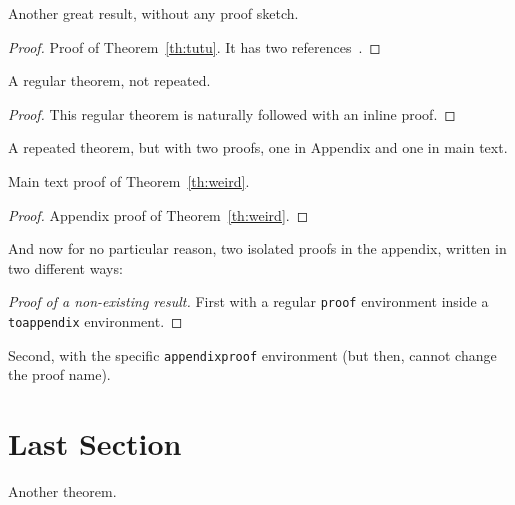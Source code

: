 \begin{theoremrep}
  \label{th:tutu}
  Another great result, without any proof sketch.
\end{theoremrep}

\begin{proof}
  Proof of Theorem~\ref{th:tutu}. It has two
  references~\cite{sitemaps,brin1998anatomy}.
\end{proof}

\begin{theorem}
  A regular theorem, not repeated.
\end{theorem}

\begin{proof}
This regular theorem is naturally followed with an inline proof.
\end{proof}

\begin{theoremrep}
  \label{th:weird}
  A repeated theorem, but with two proofs, one in Appendix and one in
  main text.
\end{theoremrep}

\begin{inlineproof}
  Main text proof of Theorem~\ref{th:weird}.
\end{inlineproof}

\begin{proof}
  Appendix proof of Theorem~\ref{th:weird}.
\end{proof}

\begin{toappendix}
And now for no particular reason, two isolated proofs in the appendix,
  written in two different ways:

  \begin{proof}[Proof of a non-existing result]
    First with a regular \texttt{proof} environment inside a
    \texttt{toappendix} environment.
  \end{proof}
\end{toappendix}

\begin{appendixproof}
  Second, with the specific \texttt{appendixproof} environment (but then,
  cannot change the proof name).
\end{appendixproof}

\section{Last Section}

\begin{theoremrep}
  \noproofinappendix
  Another theorem.
\end{theoremrep}

